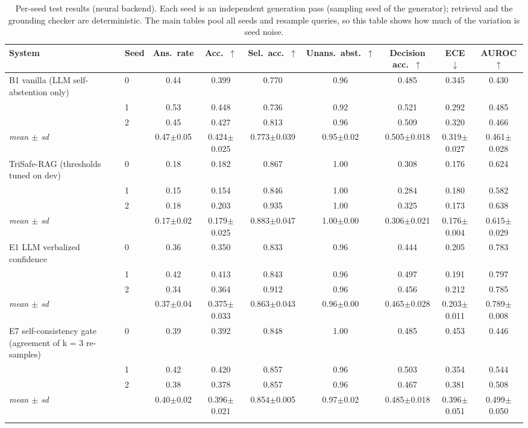 \begin{table}[t]
  \caption{Per-seed test results (neural backend). Each seed is an independent generation pass (sampling seed of the generator); retrieval and the grounding checker are deterministic. The main tables pool all seeds and resample queries, so this table shows how much of the variation is seed noise.}
  \label{tab:seeds-neural}
  \footnotesize
  \setlength{\tabcolsep}{4pt}
  \begin{tabular}{llccccccc}
    \toprule
    System & Seed & Ans.\ rate & Acc.\ $\uparrow$ & Sel.\ acc.\ $\uparrow$ & Unans.\ abst.\ $\uparrow$ & Decision acc.\ $\uparrow$ & ECE $\downarrow$ & AUROC $\uparrow$ \\
    \midrule
    B1 vanilla (LLM self-abstention only) & 0 & 0.44 & 0.399 & 0.770 & 0.96 & 0.485 & 0.345 & 0.430 \\
     & 1 & 0.53 & 0.448 & 0.736 & 0.92 & 0.521 & 0.292 & 0.485 \\
     & 2 & 0.45 & 0.427 & 0.813 & 0.96 & 0.509 & 0.320 & 0.466 \\
    \quad \emph{mean $\pm$ sd} & & 0.47$\pm$0.05 & 0.424$\pm$0.025 & 0.773$\pm$0.039 & 0.95$\pm$0.02 & 0.505$\pm$0.018 & 0.319$\pm$0.027 & 0.461$\pm$0.028 \\
    \addlinespace
    TriSafe-RAG (thresholds tuned on dev) & 0 & 0.18 & 0.182 & 0.867 & 1.00 & 0.308 & 0.176 & 0.624 \\
     & 1 & 0.15 & 0.154 & 0.846 & 1.00 & 0.284 & 0.180 & 0.582 \\
     & 2 & 0.18 & 0.203 & 0.935 & 1.00 & 0.325 & 0.173 & 0.638 \\
    \quad \emph{mean $\pm$ sd} & & 0.17$\pm$0.02 & 0.179$\pm$0.025 & 0.883$\pm$0.047 & 1.00$\pm$0.00 & 0.306$\pm$0.021 & 0.176$\pm$0.004 & 0.615$\pm$0.029 \\
    \addlinespace
    E1 LLM verbalized confidence & 0 & 0.36 & 0.350 & 0.833 & 0.96 & 0.444 & 0.205 & 0.783 \\
     & 1 & 0.42 & 0.413 & 0.843 & 0.96 & 0.497 & 0.191 & 0.797 \\
     & 2 & 0.34 & 0.364 & 0.912 & 0.96 & 0.456 & 0.212 & 0.785 \\
    \quad \emph{mean $\pm$ sd} & & 0.37$\pm$0.04 & 0.375$\pm$0.033 & 0.863$\pm$0.043 & 0.96$\pm$0.00 & 0.465$\pm$0.028 & 0.203$\pm$0.011 & 0.789$\pm$0.008 \\
    \addlinespace
    E7 self-consistency gate (agreement of k = 3 re-samples) & 0 & 0.39 & 0.392 & 0.848 & 1.00 & 0.485 & 0.453 & 0.446 \\
     & 1 & 0.42 & 0.420 & 0.857 & 0.96 & 0.503 & 0.354 & 0.544 \\
     & 2 & 0.38 & 0.378 & 0.857 & 0.96 & 0.467 & 0.381 & 0.508 \\
    \quad \emph{mean $\pm$ sd} & & 0.40$\pm$0.02 & 0.396$\pm$0.021 & 0.854$\pm$0.005 & 0.97$\pm$0.02 & 0.485$\pm$0.018 & 0.396$\pm$0.051 & 0.499$\pm$0.050 \\
    \addlinespace
    \bottomrule
  \end{tabular}
\end{table}
